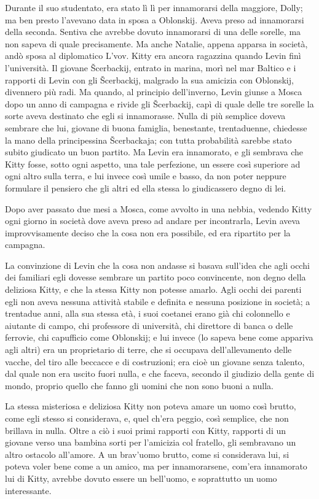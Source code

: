 Durante il suo studentato, era stato lì lì per innamorarsi della maggiore, Dolly; ma ben presto l'avevano data in sposa a Oblonskij. Aveva preso ad innamorarsi della seconda. Sentiva che avrebbe dovuto innamorarsi di una delle sorelle, ma non sapeva di quale precisamente. Ma anche Natalie, appena apparsa in società, andò sposa al diplomatico L'vov. Kitty era ancora ragazzina quando Levin finì l'università. Il giovane Šcerbackij, entrato in marina, morì nel mar Baltico e i rapporti di Levin con gli Šcerbackij, malgrado la sua amicizia con Oblonskij, divennero più radi. Ma quando, al principio dell'inverno, Levin giunse a Mosca dopo un anno di campagna e rivide gli Šcerbackij, capì di quale delle tre sorelle la sorte aveva destinato che egli si innamorasse. Nulla di più semplice doveva sembrare che lui, giovane di buona famiglia, benestante, trentaduenne, chiedesse la mano della principessina Šcerbackaja; con tutta probabilità sarebbe stato subito giudicato un buon partito. Ma Levin era innamorato, e gli sembrava che Kitty fosse, sotto ogni aspetto, una tale perfezione, un essere così superiore ad ogni altro sulla terra, e lui invece così umile e basso, da non poter neppure formulare il pensiero che gli altri ed ella stessa lo giudicassero degno di lei. 

Dopo aver passato due mesi a Mosca, come avvolto in una nebbia, vedendo Kitty ogni giorno in società dove aveva preso ad andare per incontrarla, Levin aveva improvvisamente deciso che la cosa non era possibile, ed era ripartito per la campagna. 

La convinzione di Levin che la cosa non andasse si basava sull'idea che agli occhi dei familiari egli dovesse sembrare un partito poco convincente, non degno della deliziosa Kitty, e che la stessa Kitty non potesse amarlo. Agli occhi dei parenti egli non aveva nessuna attività stabile e definita e nessuna posizione in società; a trentadue anni, alla sua stessa età, i suoi coetanei erano già chi colonnello e aiutante di campo, chi professore di università, chi direttore di banca o delle ferrovie, chi capufficio come Oblonskij; e lui invece (lo sapeva bene come appariva agli altri) era un proprietario di terre, che si occupava dell'allevamento delle vacche, del tiro alle beccacce e di costruzioni; era cioè un giovane senza talento, dal quale non era uscito fuori nulla, e che faceva, secondo il giudizio della gente di mondo, proprio quello che fanno gli uomini che non sono buoni a nulla. 

La stessa misteriosa e deliziosa Kitty non poteva amare un uomo così brutto, come egli stesso si considerava, e, quel ch'era peggio, così semplice, che non brillava in nulla. Oltre a ciò i suoi primi rapporti con Kitty, rapporti di un giovane verso una bambina sorti per l'amicizia col fratello, gli sembravano un altro ostacolo all'amore. A un brav'uomo brutto, come si considerava lui, si poteva voler bene come a un amico, ma per innamorarsene, com'era innamorato lui di Kitty, avrebbe dovuto essere un bell'uomo, e soprattutto un uomo interessante. 

